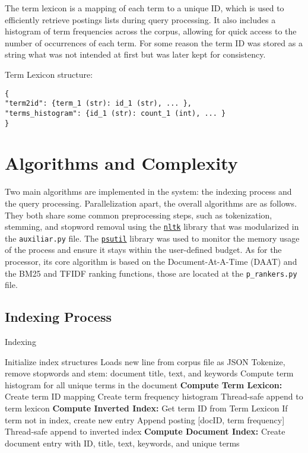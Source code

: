 The term lexicon is a mapping of each term to a unique ID, which is used to efficiently retrieve postings lists during query processing. It also includes a histogram of term frequencies across the corpus, allowing for quick access to the number of occurrences of each term. For some reason the term ID was stored as a string what was not intended at first but was later kept for consistency.

Term Lexicon structure:

\begin{verbatim}
{
"term2id": {term_1 (str): id_1 (str), ... },
"terms_histogram": {id_1 (str): count_1 (int), ... }
}
\end{verbatim}

\section{Algorithms and Complexity} \label{sec:algorithms}

Two main algorithms are implemented in the system: the indexing process and the query processing. Parallelization apart, the overall algorithms are as follows. They both share some common preprocessing steps, such as tokenization, stemming, and stopword removal using the \href{https://www.nltk.org/}{\texttt{nltk}} library that was modularized in the \texttt{auxiliar.py} file. The \href{https://psutil.readthedocs.io/}{\texttt{psutil}} library was used to monitor the memory usage of the process and ensure it stays within the user-defined budget. As for the processor, its core algorithm is based on the Document-At-A-Time (DAAT) and the BM25 and TFIDF ranking functions, those are located at the \texttt{p\_rankers.py} file.

\subsection{Indexing Process} \label{subsec:indexing}

\begin{algorithm}[H]
  \caption{Indexing}
  \begin{algorithmic}
    \STATE Initialize index structures
    \STATE Loads new line from corpus file as JSON
    \STATE Tokenize, remove stopwords and stem: document title, text, and keywords
    \STATE Compute term histogram for all unique terms in the document
    \STATE \textbf{Compute Term Lexicon:}
    \STATE \quad Create term ID mapping
    \STATE \quad Create term frequency histogram
    \STATE \quad Thread-safe append to term lexicon
    \STATE \textbf{Compute Inverted Index:}
    \quad {}
    \STATE \qquad Get term ID from Term Lexicon
    \STATE \qquad If term not in index, create new entry
    \STATE \qquad Append posting [docID, term frequency]
    \STATE \qquad Thread-safe append to inverted index
    \ENDFOR
    \STATE \textbf{Compute Document Index:}
    \STATE \quad Create document entry with ID, title, text, keywords, and unique terms
    \ENDFOR
  \end{algorithmic}
\end{algorithm}

